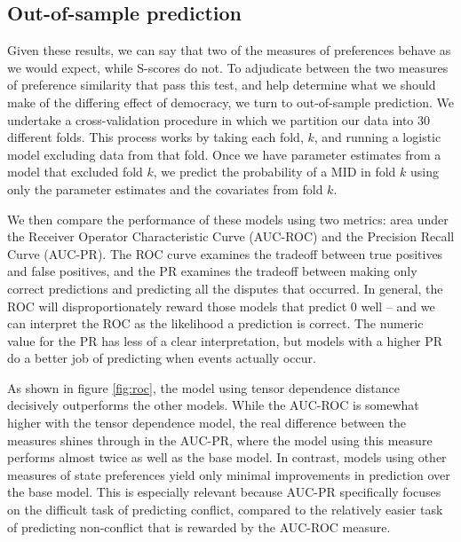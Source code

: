 \documentclass[12pt,pdflatex]{elsarticle}
\begin{document}
\subsection*{Out-of-sample prediction}

Given these results, we can say that two of the measures of preferences behave as we would expect, while S-scores do not. To adjudicate between the two measures of preference similarity that pass this test, and help determine what we should make of the differing effect of democracy, we turn to out-of-sample prediction. We undertake a cross-validation procedure in which we partition our data into 30 different folds. This process works by taking each fold, $k$, and running a logistic model excluding data from that fold. Once we have parameter estimates from a model that excluded fold $k$, we predict the probability of a MID in fold $k$ using only the parameter estimates and the covariates from fold $k$.

We then compare the performance of these models using two metrics: area under the Receiver Operator Characteristic Curve (AUC-ROC) and the Precision Recall Curve (AUC-PR). The ROC curve examines the tradeoff between true positives and false positives, and the PR examines the tradeoff between making only correct predictions and predicting all the disputes that occurred. In general, the ROC will disproportionately reward those models that predict $0$ well -- and we can interpret the ROC as the likelihood a prediction is correct. The numeric value for the PR has less of a clear interpretation, but models with a higher PR do a better job of predicting when events actually occur.

As shown in figure \ref{fig:roc}, the model using tensor dependence distance decisively outperforms the other models. While the AUC-ROC is somewhat higher with the tensor dependence model, the real difference between the measures shines through in the AUC-PR, where the model using this measure performs almost twice as well as the base model. In contrast, models using other measures of state preferences yield only minimal improvements in prediction over the base model. This is especially relevant because AUC-PR specifically focuses on the difficult task of predicting conflict, compared to the relatively easier task of predicting non-conflict that is rewarded by the AUC-ROC measure.
\end{document}
